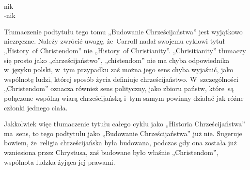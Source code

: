 \documentclass[a4paper,11pt]{article}
\begin{document}
\noindent
{} \\
\Jest \hspace{5pt} nik \\
\Powin -nik \\

\vspace{\spaceTwo}














\start Tłumaczenie podtytułu tego tomu „Budowanie Chrześcijaństwa”
jest wyjątkowo niezręczne. Należy zwrócić uwagę, że~Carroll nadał
swojemu cyklowi tytuł „History~of Christendom” nie „History~of
Christianity”. „Chrisitianity” tłumaczy się prosto jako
„chrześcijaństwo”, „chistendom” nie ma chyba odpowiednika w~języku
polski, w~tym przypadku zaś można jego sens chyba wyjaśnić, jako
wspólnotę ludzi, której sposób życia definiuje chrześcijaństwo.
W~szczególności „Christendom” oznacza również sens polityczny, jako
zbioru państw, które~są połączone wspólną wiarą chrześcijańską i~tym
samym powinny działać jak różne członki jednego ciała.

Jakkolwiek więc tłumaczenie tytułu całego cyklu jako „Historia
Chrześcijaństwa” ma~sens, to tego podtytułu jako „Budowanie
Chrześcijaństwa” już nie. Sugeruje bowiem, że~religia chrześcijańska
była budowana, podczas gdy ona została już wzniesiona przez Chrystusa,
zaś budowane było właśnie „Christendom”, wspólnota ludzka żyjąca jej
prawami.

\vspace{\spaceFour}










\end{document}
